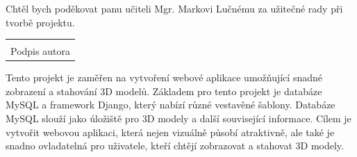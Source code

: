 \documentclass[12pt, a4paper,
oneside,      %
openright
]{report}
\newcommand\datumOdevzdani{1. 1. 2024} %
\begin{document}
\newpage %
	

	\clearpage
	\noindent Chtěl bych poděkovat panu učiteli Mgr. Markovi Lučnému za užitečné rady při tvorbě projektu.
	
	\vspace*{0.7\textheight} %

	\vfill
	\noindent{V Opavě \datumOdevzdani\\}
	\noindent
	\begin{minipage}{\linewidth}
		\hspace{9.5cm} 
		\begin{tabular}{@{}p{6cm}@{}}
			\dotfill \\
			Podpis autora
		\end{tabular}
	\end{minipage}
	
	


	\noindent Tento projekt je zaměřen na vytvoření webové aplikace umožňující snadné zobrazení a stahování 3D modelů. Základem pro tento projekt je databáze MySQL a framework Django, který nabízí různé vestavěné šablony. Databáze MySQL slouží jako úložiště pro 3D modely a další související informace. Cílem je vytvořit webovou aplikaci, která nejen vizuálně působí atraktivně, ale také je snadno ovladatelná pro uživatele, kteří chtějí zobrazovat a stahovat 3D modely. \\
	\vspace{18pt}
	
\end{document}
